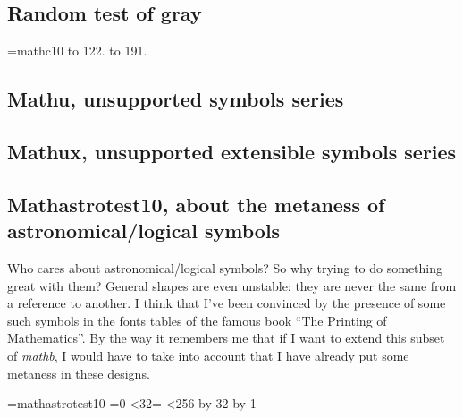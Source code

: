 

\subsection*{Random test of gray}

{\font\currentfont=mathc10\currentfont
{} to 122.
 to 191.
\digits
}

\newpage

\subsection*{Mathu, unsupported symbols series}

{\centerlargechars
\def\fontname{mathu10 }
\startfont\table}

\subsection*{Mathux, unsupported extensible symbols series}

{\centerlargechars
\def\fontname{mathux10 }
\startfont\table}

\subsection*{Mathastrotest10, about the metaness
of astronomical/logical symbols}\break
Who cares about astronomical/logical symbols? So why trying to do
something great with them? General shapes are even unstable: they are
never the same from a reference to another. I think that I've been
convinced by the presence of some such symbols in the fonts tables of
the famous book ``The Printing of Mathematics''. By the way it
remembers me that if I want to extend this subset of {\it mathb}, I
would have to take into account that I have already put some metaness
in these designs.

\medbreak\noindent
{\font\currentfont=mathastrotest10
\currentfont
{}=0
\loop\ifnum{}<32\relax{}=
{\loop\ifnum{}<256\char\the{}\advance{} by 32\repeat}
\hfil\allowbreak\advance{} by 1\repeat}

{\def\fontname{mathastrotest10 }
\startfont\table}


\bye




